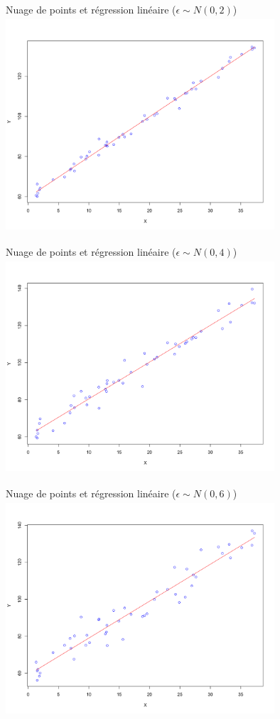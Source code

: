 \documentclass{beamer}
\begin{document}
\begin{frame}{Nuage de points et régression linéaire (\( \epsilon \sim N(0,2) \))}
  \includegraphics[width=10cm, height=8cm]{ols_2.png}
\end{frame}

\begin{frame}{Nuage de points et régression linéaire (\( \epsilon \sim N(0,4) \))}
  \includegraphics[width=10cm, height=8cm]{ols_4.png}
\end{frame}

\begin{frame}{Nuage de points et régression linéaire (\( \epsilon \sim N(0,6) \))}
  \includegraphics[width=10cm, height=8cm]{ols_6.png}
\end{frame}
\end{document}
